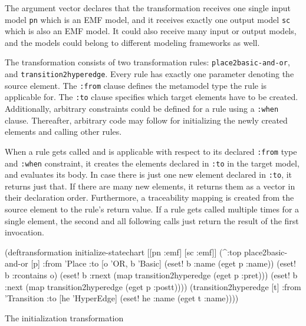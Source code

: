 \documentclass[submission]{eptcs}
\begin{document}
The argument vector declares that the transformation receives one single input
model \verb|pn| which is an EMF model, and it receives exactly one output model
\verb|sc| which is also an EMF model.  It could also receive many input or
output models, and the models could belong to different modeling frameworks as
well.

\begin{sloppypar}
  The transformation consists of two transformation rules:
  \verb|place2basic-and-or|, and \verb|transition2hyperedge|.  Every rule has
  exactly one parameter denoting the source element.  The \verb|:from| clause
  defines the metamodel type the rule is applicable for.  The \verb|:to| clause
  specifies which target elements have to be created.  Additionally, arbitrary
  constraints could be defined for a rule using a \verb|:when| clause.
  Thereafter, arbitrary code may follow for initializing the newly created
  elements and calling other rules.
\end{sloppypar}

When a rule gets called and is applicable with respect to its declared
\verb|:from| type and \verb|:when| constraint, it creates the elements declared
in \verb|:to| in the target model, and evaluates its body.  In case there is
just one new element declared in \verb|:to|, it returns just that.  If there
are many new elements, it returns them as a vector in their declaration order.
Furthermore, a traceability mapping is created from the source element to the
rule's return value.  If a rule gets called multiple times for a single
element, the second and all following calls just return the result of the first
invocation.


\begin{listing}[H]
  \begin{clojurecode}
(deftransformation initialize-statechart [[pn :emf] [sc :emf]]
  (^:top place2basic-and-or [p]
         :from 'Place
         :to [o 'OR, b 'Basic]
         (eset! b :name (eget p :name))
         (eset! b :rcontains o)
         (eset! b :rnext (map transition2hyperedge
                              (eget p :pret)))
         (eset! b :next  (map transition2hyperedge
                              (eget p :postt))))
  (transition2hyperedge [t]
         :from 'Transition
         :to [he 'HyperEdge]
         (eset! he :name (eget t :name))))
  \end{clojurecode}
  \label{lst:init}
  \caption{The initialization transformation}
\end{listing}
\end{document}
